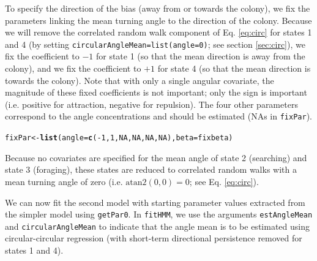 \documentclass[12pt]{article}\usepackage[]{graphicx}\usepackage[]{xcolor}
\makeatletter
\newcommand{\hlnum}[1]{\textcolor[rgb]{0.686,0.059,0.569}{#1}}%
\newcommand{\hlopt}[1]{\textcolor[rgb]{0,0,0}{#1}}%
\newcommand{\hldef}[1]{\textcolor[rgb]{0.345,0.345,0.345}{#1}}%
\newcommand{\hlkwb}[1]{\textcolor[rgb]{0.69,0.353,0.396}{#1}}%
\newcommand{\hlkwc}[1]{\textcolor[rgb]{0.333,0.667,0.333}{#1}}%
\newcommand{\hlkwd}[1]{\textcolor[rgb]{0.737,0.353,0.396}{\textbf{#1}}}%
\newenvironment{kframe}{%
 \def\at@end@of@kframe{}%
 \ifinner\ifhmode%
  \def\at@end@of@kframe{\end{minipage}}%
  \begin{minipage}{\columnwidth}%
 \fi\fi%
 \def\FrameCommand##1{\hskip\@totalleftmargin \hskip-\fboxsep
 \colorbox{shadecolor}{##1}\hskip-\fboxsep
     \hskip-\linewidth \hskip-\@totalleftmargin \hskip\columnwidth}%
 \MakeFramed {\advance\hsize-\width
   \@totalleftmargin\z@ \linewidth\hsize
   \@setminipage}}%
 {\par\unskip\endMakeFramed%
 \at@end@of@kframe}
\newenvironment{knitrout}{}{} %
\makeatother
\begin{document}
To specify the direction of the bias (away from or towards the colony), we fix the parameters linking the mean turning angle to the direction of the colony. Because we will remove the correlated random walk component of Eq. \ref{eq:circ} for states 1 and 4 (by setting \verb|circularAngleMean=list(angle=0)|; see section \ref{sec:circ}), we fix the coefficient to $-1$ for state 1 (so that the mean direction is away from the colony), and we fix the coefficient to $+1$ for state 4 (so that the mean direction is towards the colony). Note that with only a single angular covariate, the magnitude of these fixed coefficients is not important; only the sign is important (i.e. positive for attraction, negative for repulsion). The four other parameters correspond to the angle concentrations and should be estimated (NAs in \verb|fixPar|).
\begin{knitrout}
\color{fgcolor}\begin{kframe}
\begin{alltt}
\hldef{fixPar} \hlkwb{<-} \hlkwd{list}\hldef{(}\hlkwc{angle}\hldef{=}\hlkwd{c}\hldef{(}\hlopt{-}\hlnum{1}\hldef{,}\hlnum{1}\hldef{,}\hlnum{NA}\hldef{,}\hlnum{NA}\hldef{,}\hlnum{NA}\hldef{,}\hlnum{NA}\hldef{),}\hlkwc{beta}\hldef{=fixbeta)}
\end{alltt}
\end{kframe}
\end{knitrout}
Because no covariates are specified for the mean angle of state 2 (searching) and state 3 (foraging), these states are reduced to correlated random walks with a mean turning angle of zero (i.e. $\text{atan2}(0,0)=0$; see Eq. \ref{eq:circ}).

We can now fit the second model with starting parameter values extracted from the simpler model using \verb|getPar0|. In \verb|fitHMM|, we use the arguments \verb|estAngleMean| and \verb|circularAngleMean| to indicate that the angle mean is to be estimated using circular-circular regression (with short-term directional persistence removed for states 1 and 4).
\end{document}
